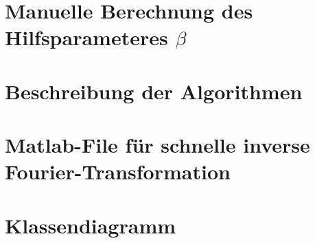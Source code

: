 \clearpage
\section{Manuelle Berechnung des Hilfsparameteres $\beta$}
\label{app:beta}


\clearpage
\section{Beschreibung der Algorithmen}
\label{app:algos}


\clearpage
\section{Matlab-File f\"ur schnelle inverse Fourier-Transformation}
\label{app:fftgut}


\clearpage
\section{Klassendiagramm}
\clearpage
\label{app:classdiagram}
%
